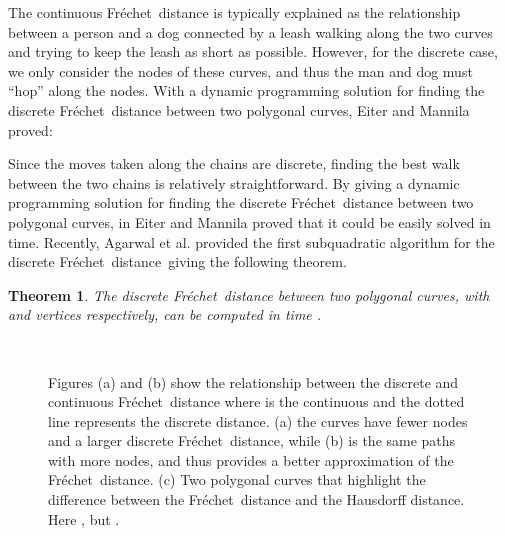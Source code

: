 \documentclass{article}[11pt]
\newcommand{\frechet}{Fr\'echet}
\newcommand{\dfd}{discrete \frechet\ distance}
\newtheorem{theorem}{Theorem}
\begin{document}
The continuous \frechet\ distance is typically explained as the relationship between a 
person and a dog connected by a leash walking along the two curves and trying
to keep the leash as short as possible.  However, for the discrete case, we only
consider the nodes of these curves, and thus the man and dog must ``hop'' along
the nodes.
With a dynamic programming solution for finding the discrete \frechet\ distance between 
two polygonal curves, Eiter and Mannila proved:

Since the moves taken along the chains are discrete, finding the best walk between the two chains
is relatively straightforward.
By giving a dynamic programming solution for finding the discrete \frechet\ distance between 
two polygonal curves, in \cite{Eiter:1994:TECH} Eiter and Mannila proved that it could be easily solved in  time.
Recently, Agarwal et al. provided the first subquadratic algorithm for the \dfd\ giving the following theorem. 


\begin{theorem} \label{thm:dfdtime}
The discrete \frechet\ distance between two polygonal curves, with  and  vertices 
respectively, can be computed in  time \cite{Agarwal:2013:SODA}.
\end{theorem}



\begin{figure}[ht!]
\begin{center}
        \hspace*{.5cm}
        \hspace*{.5cm}
         \\

    \end{center}
\caption{Figures (a) and (b) show the relationship between the discrete and continuous \frechet\ distance where  is the 
    continuous and the dotted line represents the discrete distance. (a) the curves
    have fewer nodes and a larger discrete \frechet\ distance, while (b) is the same paths with
    more nodes, and thus provides a better approximation of the \frechet\ distance.
    (c) Two polygonal curves that highlight the difference between the \frechet\ distance and the 
        Hausdorff distance. Here , but .}
    \label{fig:frec_diff}
\end{figure}                              
\end{document}
